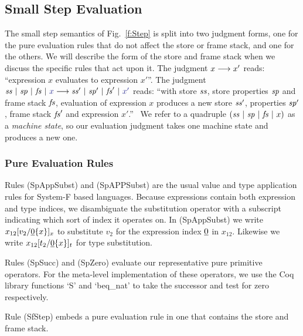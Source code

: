 
\subsection{Small Step Evaluation}
The small step semantics of Fig.~\ref{f:Step} is split into two judgment forms, one for the pure evaluation rules that do not affect the store or frame stack, and one for the others. We will describe the form of the store and frame stack when we discuss the specific rules that act upon it. The judgment $x \longrightarrow x'$ reads: ``expression $x$ evaluates to expression $x'$''. The judgment $\StepF{\mss}{\msp}{\mfs}{x}{\mss'}{\msp'}{\mfs'}{x'}$ reads: ``with store $\mathit{ss}$, store properties $\mathit{sp}$ and frame stack $\mathit{fs}$, evaluation of expression $x$ produces a new store $\mathit{ss}'$, properties $\mathit{sp}'$, frame stack $\mathit{fs}'$ and expression $x'$.''~ We refer to a quadruple $(\mathit{ss} ~|~ \mathit{sp} ~|~ \mathit{fs} ~|~ x)$ as a \emph{machine state}, so our evaluation judgment takes one machine state and produces a new one.


\eject
\subsubsection{Pure Evaluation Rules}
Rules (SpAppSubst) and (SpAPPSubst) are the usual value and type application rules for System-F based languages. Because expressions contain both expression and type indices, we disambiguate the substitution operator with a subscript indicating which sort of index it operates on. In (SpAppSubst) we write $x_{12}[v_2/\underline{0}\{x\}]_x$ to substitute $v_2$ for the expression index $\underline{0}$ in $x_{12}$. Likewise we write $x_{12}[t_2/\underline{0}\{x\}]_t$ for type substitution.

Rules (SpSucc) and (SpZero) evaluate our representative pure primitive operators. For the meta-level implementation of these operators, we use the Coq library functions `S' and `beq\_nat' to take the successor and test for zero respectively.

Rule (SfStep) embeds a pure evaluation rule in one that contains the store and frame stack.


